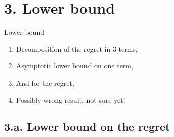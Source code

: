 \documentclass[12pt,english,ignorenonframetext,aspectratio=169,]{beamer}
\providecommand{\tightlist}{%
  \setlength{\itemsep}{0pt}\setlength{\parskip}{0pt}}
\begin{document}
\section{\hfill{}3. Lower bound\hfill{}}

\begin{frame}{Lower bound}

\begin{enumerate}
\def\labelenumi{\arabic{enumi}.}
\tightlist
\item
  Decomposition of the regret in \(3\) terms,\vspace*{15pt}
\item
  Asymptotic lower bound on one term,\vspace*{15pt}
\item
  And for the regret,\vspace*{15pt}
\item
  \alert{Possibly wrong result, not sure yet!}
\end{enumerate}

\end{frame}



\subsection{\hfill{}3.a. Lower bound on the regret\hfill{}}
\end{document}
